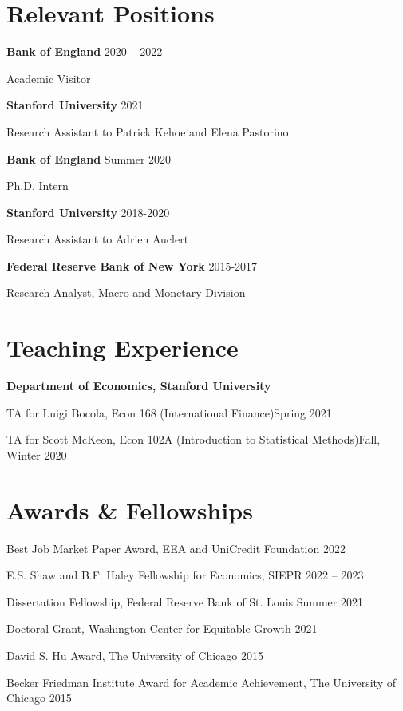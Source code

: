 \documentclass[margin,line]{res}                          %
\def\tinyskip{\vspace\tinyskipamount}
\newenvironment{list1}{
	\begin{list}{\ding{113}}{%
			\setlength{\itemsep}{0in}
			\setlength{\parsep}{0in} \setlength{\parskip}{0in}
			\setlength{\topsep}{0in} \setlength{\partopsep}{0in}
			\setlength{\leftmargin}{0.17in}}}{\end{list}}
\begin{document}
\begin{resume}
	
	\section{\sc Relevant Positions}
	\begin{list1}
		\item[] \textbf{Bank of England}  \hfill 2020 -- 2022\tinyskip
		\item[] {Academic Visitor}
		\smallskip
		\item[] \textbf{Stanford University}  \hfill 2021\tinyskip
		\item[] {Research Assistant to Patrick Kehoe and Elena Pastorino}
		\smallskip
		\item[] \textbf{Bank of England}  \hfill Summer 2020\tinyskip
		\item[] {Ph.D. Intern}
		\smallskip
		\item[] \textbf{Stanford University}  \hfill 2018-2020 \tinyskip
		\item[] {Research Assistant to Adrien Auclert}\smallskip
		\item[] \textbf{Federal Reserve Bank of New York}  \hfill 2015-2017 \tinyskip
		\item[] {Research Analyst, Macro and Monetary Division}
	\end{list1}
	
	\section{\sc Teaching Experience}
	\begin{list1}
		\item[] \textbf{Department of Economics, Stanford University} \smallskip
		\item[] TA for Luigi Bocola, Econ 168 (International Finance)\hfill Spring 2021\smallskip
		\item[] TA for Scott McKeon, Econ 102A (Introduction to Statistical Methods)\hfill Fall, Winter 2020\smallskip
	\end{list1}
	
	\section{\sc Awards \& Fellowships}
	\begin{list1}
		\item[] Best Job Market Paper Award, EEA and UniCredit Foundation
		 \hfill 2022\smallskip
		\item[] E.S. Shaw and B.F. Haley Fellowship for Economics, SIEPR \hfill 2022 -- 2023\smallskip
		\item[] Dissertation Fellowship, Federal Reserve Bank of St. Louis  \hfill Summer 2021\smallskip
		\item[] Doctoral Grant, Washington Center for Equitable Growth \hfill 2021\smallskip
		\item[] David S. Hu Award, The University of Chicago \hfill 2015\smallskip
		\item[] Becker Friedman Institute Award for Academic Achievement, The University of Chicago \hfill 2015\smallskip
	\end{list1}
	

\end{resume}
\end{document}
